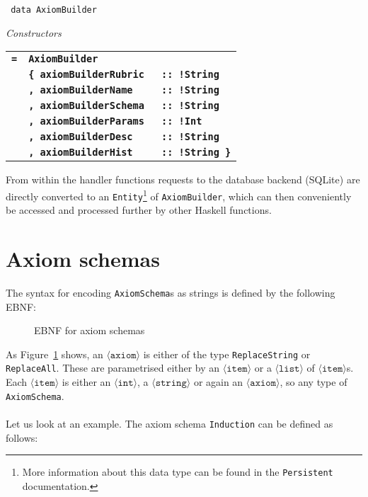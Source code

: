 \documentclass[notitlepage]{report}
\newcommand\m[1]{\texttt{#1}}
\begin{document}
\newcommand{\htt}[1]{{\small\bfseries\texttt{#1}}}

\begin{haddockdesc}
\item[\texttt{
data AxiomBuilder
}]
{\haddockbegindoc
\enspace \emph{Constructors}\par
\begin{tabulary}{\linewidth}{@{}llJ@{}}
    \htt{=}  &   \htt{AxiomBuilder}         &                 \\
             &   \htt{\{  axiomBuilderRubric } &\htt{:: !String} \\
             &   \htt{,   axiomBuilderName   } &\htt{:: !String} \\
             &   \htt{,   axiomBuilderSchema } &\htt{:: !String} \\
             &   \htt{,   axiomBuilderParams } &\htt{:: !Int   } \\
             &   \htt{,   axiomBuilderDesc   } &\htt{:: !String} \\
             &   \htt{,   axiomBuilderHist   } &\htt{:: !String \}}
 \end{tabulary}}
\end{haddockdesc}

From within the handler functions requests to the database backend (SQLite) are
directly converted to an \m{Entity}\footnote{More information about this data
type can be found in the \texttt{Persistent} documentation.} of \m{AxiomBuilder},
which can then conveniently be accessed and processed further by other Haskell
functions.

\pagebreak
\section{Axiom schemas}\label{sec:axiom_schemas}

The syntax for encoding \m{AxiomSchema}s as strings is defined by the following
EBNF:
\begin{figure}[h!]
    {\renewcommand{\arraystretch}{2.0}
    }
    \caption{EBNF for axiom schemas}\label{fig:EBNFaxiom}
\end{figure}

As Figure~\ref{fig:EBNFaxiom} shows, an $\langle \texttt{axiom} \rangle$ is either
of the type \m{ReplaceString} or \m{ReplaceAll}. These are parametrised either
by an $\langle \texttt{item} \rangle$ or a $\langle \texttt{list} \rangle$
of $\langle \texttt{item} \rangle$s. Each $\langle \texttt{item} \rangle$ is
either an $\langle \texttt{int} \rangle$, a $\langle \texttt{string} \rangle$
or again an $\langle \texttt{axiom} \rangle$, so any type of \m{AxiomSchema}.
\\\\
Let us look at an example. The axiom schema \texttt{Induction} can be defined as
follows:
\end{document}

